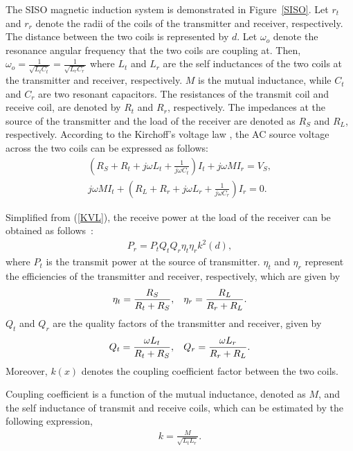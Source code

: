 \documentclass[twocolumn,10pt]{IEEEtran}
\begin{document}
The SISO magnetic induction system is demonstrated in Figure~\ref{SISO}. Let $r_{t}$ and $r_{r}$ denote the radii of the coils of the transmitter and receiver, respectively. The distance between the two coils is represented by $d$. Let $\omega_{o}$ denote the resonance angular frequency that the two coils are coupling at. Then, $\omega_{o}=\frac{1}{\sqrt{L_{t}C_{t}}}=\frac{1}{\sqrt{L_{r}C_{r}}}$ where $L_{t}$ and $L_{r}$ are the self inductances of the two coils at the transmitter and receiver, respectively. $M$ is the mutual inductance, while $C_{t}$ and $C_{r}$ are two resonant capacitors. The resistances of the transmit coil and receive coil, are denoted by $R_{t}$ and $R_{r}$, respectively. The impedances at the source of the transmitter and the load of the receiver are denoted as $R_{S}$ and $R_{L}$, respectively. According to the Kirchoff's voltage law \cite{H.2013Nguyen}, the AC source voltage across the two coils can be expressed as follows:
\begin{eqnarray} \label{KVL}
(R_{S}+R_{t}+j \omega L_{t} +\frac{1}{j \omega C_{t}} ) I_{t} + j\omega M I_{r} = V_{S}	, \nonumber \\ 
j \omega M I_{t} + (R_{L} + R_{r} + j \omega L_{r}+\frac{1}{j \omega C_{r}}) I_{r} =0 	.
\end{eqnarray}

Simplified from (\ref{KVL}), the receive power at the load of the receiver can be obtained as follows~\cite{U.2012Azad}:
\begin{eqnarray}\label{P_r}
	P_{r} = P_{t}Q_{t}Q_{r}\eta_{t}\eta_{r}k^{2}(d) ,
\end{eqnarray}
where $P_{t}$ is the transmit power at the source of transmitter. 
$\eta_{t}$ and $\eta_{r}$ represent the efficiencies of the transmitter and receiver, respectively, which are given by 
\begin{eqnarray}
\eta_{t}=\frac{R_{S}}{R_{t}+R_{S}}, \hspace{3mm} \eta_{r}=\frac{R_{L}}{R_{r}+R_{L}}	.
\end{eqnarray}
$Q_{t}$ and $Q_{r}$ are the quality factors of the transmitter and receiver, given by
\begin{eqnarray}
Q_{t}=\frac{\omega L_{t}}{R_{t}+R_{S}}, \hspace{3mm} Q_{r}=\frac{\omega L_{r}}{R_{r}+R_{L}}	.
\end{eqnarray}
Moreover, $k(x)$ denotes the coupling coefficient factor between the two coils.

Coupling coefficient is a function of the mutual inductance, denoted as $M$, and the self inductance of transmit and receive coils, which can be estimated by the following expression, 
\begin{eqnarray}
k=\frac{M}{\sqrt{L_{t}L_{r}}}.
\end{eqnarray}
\end{document}
